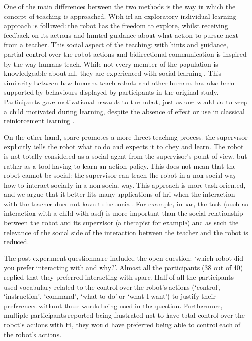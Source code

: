 One of the main differences between the two methods is the way in which the concept of teaching is approached. With \gls{irl} an exploratory individual learning approach is followed: the robot has the freedom to explore, whilst receiving feedback on its actions and limited guidance about what action to pursue next from a teacher. This social aspect of the teaching: with hints and guidance, partial control over the robot actions and bidirectional communication is inspired by the way humans teach. While not every member of the population is knowledgeable about \gls{ml}, they are experienced with social learning \citep{thomaz2008teachable}. This similarity between how humans teach robots and other humans has also been supported by behaviours displayed by participants in the original study. Participants gave motivational rewards to the robot, just as one would do to keep a child motivated during learning, despite the absence of effect or use in classical reinforcement learning \citep{thomaz2008teachable}.

On the other hand, \gls{sparc} promotes a more direct teaching process: the supervisor explicitly tells the robot what to do and expects it to obey and learn. The robot is not totally considered as a social agent from the supervisor's point of view, but rather as a tool having to learn an action policy. This does not mean that the robot cannot be social: the supervisor can teach the robot in a non-social way how to interact socially in a non-social way. This approach is more task oriented, and we argue that it better fits many applications of \gls{hri} when the interaction with the teacher does not have to be social. For example, in \gls{sar}, the task (such as interaction with a child with \gls{asd}) is more important than the social relationship between the robot and its supervisor (a therapist for example) and as such the relevance of the social side of the interaction between the teacher and the robot is reduced.

The post-experiment questionnaire included the open question: `which robot did you prefer interacting with and why?'. Almost all the participants (38 out of 40) replied that they preferred interacting with \gls{sparc}. Half of all the participants used vocabulary related to the control over the robot's actions (`control', `instruction', `command', `what to do' or `what I want') to justify their preferences without these words being used in the question. Furthermore, multiple participants reported being frustrated not to have total control over the robot's actions with \gls{irl}, they would have preferred being able to control each of the robot's actions. 

